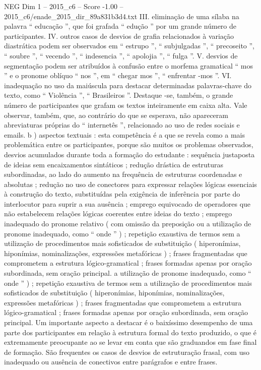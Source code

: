 \begin{textsample}{NEG Dim 1 – 2015\_c6 – Score -1.00 – 2015\_c6/enade\_2015\_dir\_89a831b3d4.txt}
III. eliminação de uma sílaba na palavra “ educação ”, que foi grafada “ edução ” por um grande número de participantes.
IV. outros casos de desvios de grafia relacionados à variação diastrática podem ser observados em “ estrupo ”, “ subjulgadas ”, “ precoseito ”, “ soubre ”, “ vecendo ”, “ indesencia ”, “ apolojia ”, “ fulga ”.
V. desvios de segmentação podem ser atribuídos à confusão entre o morfema gramatical “ mos ” e o pronome oblíquo “ nos ”, em “ chegar mos ”, “ enfrentar -mos ”.
VI. inadequação no uso da maiúscula para destacar determinadas palavras-chave do texto, como “ Violência ”, “ Brasileiros ”.
Destaque -se, também, o grande número de participantes que grafam os textos inteiramente em caixa alta.
Vale observar, também, que, ao contrário do que se esperava, não apareceram abreviaturas próprias do “ internetês ”, relacionado ao uso de redes sociais e emails. b ) aspectos textuais : esta competência é a que se revela como a mais problemática entre os participantes, porque são muitos os problemas observados, desvios acumulados durante toda a formação do estudante : sequência justaposta de ideias sem encaixamentos sintáticos ; redução drástica de estruturas subordinadas, ao lado do aumento na frequência de estruturas coordenadas e absolutas ; redução no uso de conectores para expressar relações lógicas essenciais à construção do texto, substituídas pela exigência de inferência por parte do interlocutor para suprir a sua ausência ; emprego equivocado de operadores que não estabelecem relações lógicas coerentes entre ideias do texto ; emprego inadequado do pronome relativo ( com omissão da preposição ou a utilização de pronome inadequado, como “ onde ” ) ; repetição exaustiva de termos sem a utilização de procedimentos mais sofisticados de substituição ( hiperonímias, hiponímias, nominalizações, expressões metafóricas ) ; frases fragmentadas que comprometem a estrutura lógico-gramatical ; frases formadas apenas por oração subordinada, sem oração principal. a utilização de pronome inadequado, como “ onde ” ) ; repetição exaustiva de termos sem a utilização de procedimentos mais sofisticados de substituição ( hiperonímias, hiponímias, nominalizações, expressões metafóricas ) ; frases fragmentadas que comprometem a estrutura lógico-gramatical ; frases formadas apenas por oração subordinada, sem oração principal.
Um importante aspecto a destacar é o baixíssimo desempenho de uma parte dos participantes em relação à estrutura formal do texto produzido, o que é extremamente preocupante ao se levar em conta que são graduandos em fase final de formação.
São frequentes os casos de desvios de estruturação frasal, com uso inadequado ou ausência de conectivos entre parágrafos e entre frases.

\end{textsample}

